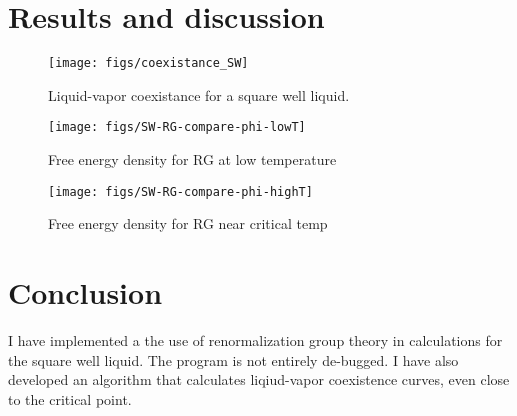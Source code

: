 \documentclass[letterpaper,twocolumn,amsmath,amssymb,prb]{revtex4-1}
\newcommand{\1}{\ensuremath{\textbf{r}_1}}
\newcommand{\2}{\ensuremath{\textbf{r}_2}}
\begin{document}
\section{Results and discussion}

\begin{figure}
  \begin{center}
  \texttt{[image: figs/coexistance\_SW]}
  \end{center}
  \caption{Liquid-vapor coexistance for a square well liquid.}
  \label{fig:coexistance_SW}
\end{figure}

\begin{figure}
  \begin{center}
  \texttt{[image: figs/SW-RG-compare-phi-lowT]}
  \end{center}
  \caption{Free energy density for RG at low temperature}
  \label{fig:SW-RG-compare-lowT}
\end{figure}

\begin{figure}
  \begin{center}
  \texttt{[image: figs/SW-RG-compare-phi-highT]}
  \end{center}
  \caption{Free energy density for RG near critical temp}
  \label{fig:SW-RG-compare-highT}
\end{figure}



\section{Conclusion}
I have implemented a the use of renormalization group theory in calculations for the square well liquid. The program is not entirely de-bugged. I have also developed an algorithm that calculates liqiud-vapor coexistence curves, even close to the critical point.



\end{document}
